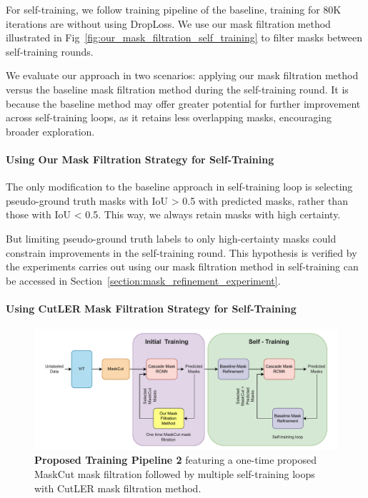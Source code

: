 For self-training, we follow training pipeline of the baseline, training for 80K iterations are without using DropLoss. We use our mask filtration method illustrated in Fig~\ref{fig:our_mask_filtration_self_training} to filter masks between self-training rounds. 
 
We evaluate our approach in two scenarios: applying our mask filtration method versus the baseline mask filtration method during the self-training round. It is because the baseline method may offer greater potential for further improvement across self-training loops, as it retains less overlapping masks, encouraging broader exploration.
 
\paragraph{Using Our Mask Filtration Strategy for Self-Training}
\label{para:our_mask_filtration}
The only modification to the baseline approach in self-training loop is selecting pseudo-ground truth masks with IoU > 0.5 with predicted masks, rather than those with IoU < 0.5. This way, we always retain masks with high certainty. 

But limiting pseudo-ground truth labels to only high-certainty masks could constrain improvements in the self-training round. This hypothesis is verified by the experiments carries out using our mask filtration method in self-training can be accessed in Section~\ref{section:mask_refinement_experiment}.
 
\paragraph{Using CutLER Mask Filtration Strategy for Self-Training}
\begin{figure}
	\centering
	\includegraphics[width=1\textwidth]{Images/main/our_approach.pdf}
	\caption[\textbf{Proposed Training Pipeline 2}]{\textbf{Proposed Training Pipeline 2} featuring a one-time proposed MaskCut mask filtration followed by multiple self-training loops with CutLER mask filtration method.}
	\label{fig:proposed_training_new}
\end{figure}

